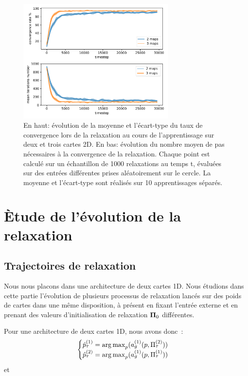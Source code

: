 \documentclass[../main]{subfiles}
\begin{document}
\begin{figure}
	\centering
	\includegraphics[width=0.7\textwidth]{2D_conv_evolution_total.pdf}
	\caption{En haut: évolution de la moyenne et l'écart-type du taux de convergence lors de la relaxation au cours de l'apprentissage sur deux et trois cartes 2D. 
	En bas: évolution du nombre moyen de pas nécessaires à la convergence de la relaxation.
	Chaque point est calculé sur un échantillon de 1000 relaxations au temps t, évaluées sur des entrées différentes prises aléatoirement sur le cercle. La moyenne et l'écart-type sont réalisés sur 10 apprentissages séparés.}
	\label{fig:conv_evolution2D}
	\end{figure}

\section{\`Etude de l'évolution de la relaxation}

\subsection{Trajectoires de relaxation\label{sec:pf}}

Nous nous placons dans une architecture de deux cartes 1D.
Nous étudions dans cette partie l'évolution de plusieurs processus de relaxation lancés sur des poids de cartes dans une même disposition, à présent en fixant l'entrée externe et en prenant des valeurs d'initialisation de relaxation $\mathbf{\Pi}_0$ différentes.


Pour une architecture de deux cartes 1D, nous avons donc~:
\begin{equation*}
	\begin{cases}
	\hat{p}^{({1})}_\tau = \operatorname*{arg\,max}_p(a_g^{({1})}(p, \Pi^{({2})}_\tau))\\
	\hat{p}^{({2})}_\tau = \operatorname*{arg\,max}_p(a_g^{({1})}(p, \Pi^{({1})}_\tau)) \\
	\end{cases}
	\end{equation*}
et 
\end{document}
